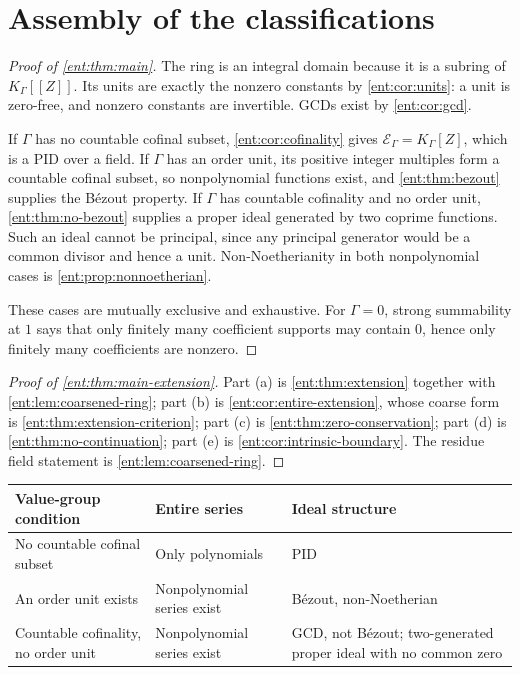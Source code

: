 \documentclass[11pt]{article}
\theoremstyle{plain}
\theoremstyle{plain}
\theoremstyle{plain}
\theoremstyle{definition}
\theoremstyle{definition}
\theoremstyle{definition}
\theoremstyle{definition}
\theoremstyle{remark}
\newcommand{\K}{K_\Gamma}\newcommand{\KD}{K_\Delta}
\newcommand{\E}{\mathcal E_\Gamma}
\begin{document}
\section{Assembly of the classifications}
\label{ent:sec:classification}

\begin{proof}[Proof of \cref{ent:thm:main}]
The ring is an integral domain because it is a subring of $\K[[Z]]$. Its
units are exactly the nonzero constants by \cref{ent:cor:units}: a unit is
zero-free, and nonzero constants are invertible. GCDs exist by
\cref{ent:cor:gcd}.

If $\Gamma$ has no countable cofinal subset, \cref{ent:cor:cofinality} gives
$\E=\K[Z]$, which is a PID over a field. If $\Gamma$ has an order unit, its
positive integer multiples form a countable cofinal subset, so nonpolynomial
functions exist, and \cref{ent:thm:bezout} supplies the B\'ezout property. If
$\Gamma$ has countable cofinality and no order unit,
\cref{ent:thm:no-bezout} supplies a proper ideal generated by two coprime
functions. Such an ideal cannot be principal, since any principal generator
would be a common divisor and hence a unit. Non-Noetherianity in both
nonpolynomial cases is \cref{ent:prop:nonnoetherian}.

These cases are mutually exclusive and exhaustive. For $\Gamma=0$, strong
summability at $1$ says that only finitely many coefficient supports may
contain $0$, hence only finitely many coefficients are nonzero.
\end{proof}

\begin{proof}[Proof of \cref{ent:thm:main-extension}]
Part (a) is \cref{ent:thm:extension} together with
\cref{ent:lem:coarsened-ring}; part (b) is
\cref{ent:cor:entire-extension}, whose coarse form is
\cref{ent:thm:extension-criterion}; part (c) is
\cref{ent:thm:zero-conservation}; part (d) is
\cref{ent:thm:no-continuation}; part (e) is
\cref{ent:cor:intrinsic-boundary}. The residue field statement is
\cref{ent:lem:coarsened-ring}.
\end{proof}

\begin{center}
\small
\begin{tabular}{@{}>{\raggedright\arraybackslash}p{}>{\raggedright\arraybackslash}p{}>{\raggedright\arraybackslash}p{}@{}}
\toprule
Value-group condition & Entire series & Ideal structure\\
\midrule
No countable cofinal subset & Only polynomials & PID\\[3pt]
An order unit exists & Nonpolynomial series exist &
B\'ezout, non-Noetherian\\[3pt]
Countable cofinality, no order unit & Nonpolynomial series exist &
GCD, not B\'ezout; two-generated proper ideal with no common zero\\
\bottomrule
\end{tabular}
\end{center}
\end{document}
